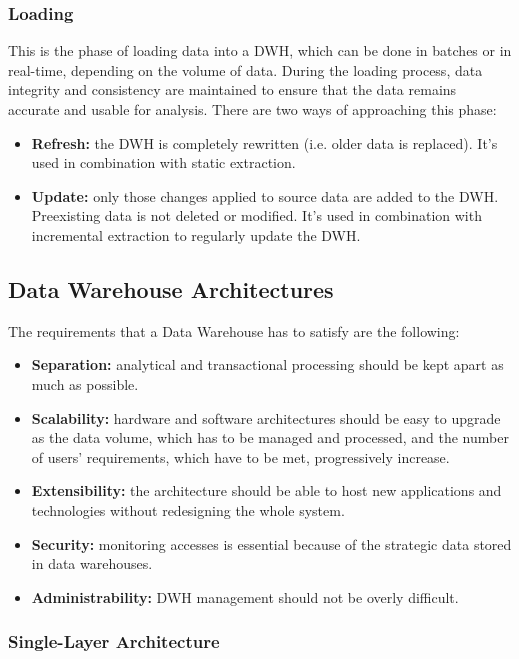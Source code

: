 \subsubsection{Loading}
This is the phase of loading data into a DWH, which can be done in batches or in real-time, depending on the volume of data. During the loading process, data integrity and consistency are maintained to ensure that the data remains accurate and usable for analysis. There are two ways of approaching this phase:
\begin{itemize}
    \item \textbf{Refresh:} the DWH is completely rewritten (i.e. older data is replaced). It's used in combination with static extraction.
    \item \textbf{Update:} only those changes applied to source data are added to the DWH. Preexisting data is not deleted or modified. It's used in combination with incremental extraction to regularly update the DWH.
\end{itemize}

\subsection{Data Warehouse Architectures}

The requirements that a Data Warehouse has to satisfy are the following:
\begin{itemize}
    \item \textbf{Separation:} analytical and transactional processing should be kept apart as much as possible.
    \item \textbf{Scalability:} hardware and software architectures should be easy to upgrade as the data volume, which has to be managed and processed, and the number of users' requirements, which have to be met, progressively increase.
    \item \textbf{Extensibility:} the architecture should be able to host new applications and technologies without redesigning the whole system.
    \item \textbf{Security:} monitoring accesses is essential because of the strategic data stored in data warehouses.
    \item \textbf{Administrability:} DWH management should not be overly difficult.
\end{itemize}

\subsubsection{Single-Layer Architecture}

